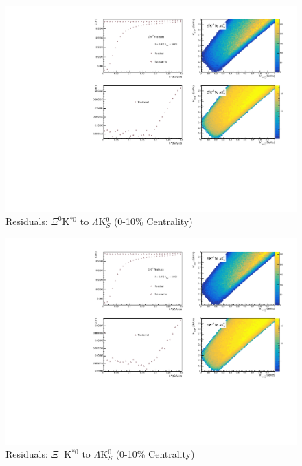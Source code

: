 \documentclass[../AnalysisNoteJBuxton.tex]{subfiles}
\begin{document}
\begin{figure}[h]
  \centering
  \includegraphics[width=\textwidth]{9_AdditionalFigures/Figures/Residuals/LamK0/Residuals_LamK0_0010_Xi0KSt0ToLamK0_MomResCrctn_NonFlatBgdCrctn_SingleLamParam_10Res_PrimMaxDecay4fm_UsingXiDataAndCoulombOnly.pdf}
  \caption[Residuals: $\Xi^{0}$K$^{*0}$ to $\Lambda$K$^{0}_{S}$ (0-10\% Centrality)]{Residuals: $\Xi^{0}$K$^{*0}$ to $\Lambda$K$^{0}_{S}$ (0-10\% Centrality)}
  \label{fig:Res_LamK0_0010_Xi0KSt0}
\end{figure}

\begin{figure}[h]
  \centering
  \includegraphics[width=\textwidth]{9_AdditionalFigures/Figures/Residuals/LamK0/Residuals_LamK0_0010_XiKSt0ToLamK0_MomResCrctn_NonFlatBgdCrctn_SingleLamParam_10Res_PrimMaxDecay4fm_UsingXiDataAndCoulombOnly.pdf}
  \caption[Residuals: $\Xi^{-}$K$^{*0}$ to $\Lambda$K$^{0}_{S}$ (0-10\% Centrality)]{Residuals: $\Xi^{-}$K$^{*0}$ to $\Lambda$K$^{0}_{S}$ (0-10\% Centrality)}
  \label{fig:Res_LamK0_0010_XiCKSt0}
\end{figure}
\end{document}
